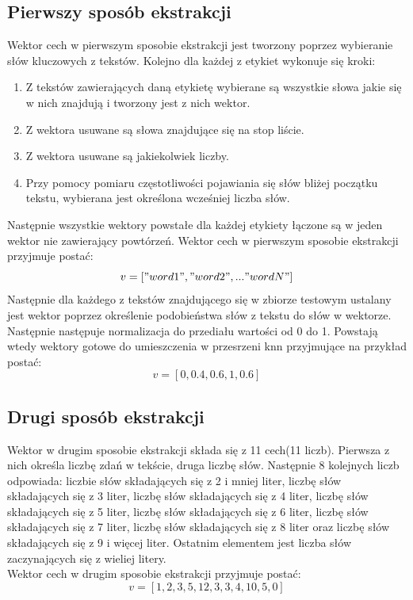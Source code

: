 \documentclass{classrep}
\begin{document}
	\subsection{Pierwszy sposób ekstrakcji}
	Wektor cech w pierwszym sposobie ekstrakcji jest tworzony poprzez wybieranie słów kluczowych z tekstów. Kolejno dla każdej z etykiet wykonuje się kroki:
	\begin{enumerate}
	    \item Z tekstów zawierających daną etykietę wybierane są wszystkie słowa jakie się w nich znajdują i tworzony jest z nich wektor.
	    \item Z wektora usuwane są słowa znajdujące się na stop liście.
	    \item Z wektora usuwane są jakiekolwiek liczby.
	    \item Przy pomocy pomiaru częstotliwości pojawiania się słów bliżej początku tekstu, wybierana jest określona wcześniej liczba słów.
	\end{enumerate}
	Następnie wszystkie wektory powstałe dla każdej etykiety łączone są w jeden wektor nie zawierający powtórzeń.
	Wektor cech w pierwszym sposobie ekstrakcji przyjmuje postać:
	\[ v = ["word1", "word2", ... "wordN"]\]
	Następnie dla każdego z tekstów znajdującego się w zbiorze testowym ustalany jest wektor poprzez określenie podobieństwa słów z tekstu do słów w wektorze. Następnie następuje normalizacja do przediału wartości od 0 do 1. Powstają wtedy wektory gotowe do umieszczenia w przesrzeni knn przyjmujące na przykład postać:
	\[ v=[0, 0.4, 0.6, 1, 0.6]\]
	
\subsection{Drugi sposób ekstrakcji}
	Wektor w drugim sposobie ekstrakcji składa się z 11 cech(11 liczb). Pierwsza z nich określa liczbę zdań w tekście, druga liczbę słów. Następnie 8 kolejnych liczb odpowiada: liczbie słów składających się z 2 i mniej liter, liczbę słów składających się z 3 liter, liczbę słów składających się z 4 liter, liczbę słów składających się z 5 liter, liczbę słów składających się z 6 liter, liczbę słów składających się z 7 liter, liczbę słów składających się z 8 liter oraz  liczbę słów składających się z 9 i więcej liter. Ostatnim elementem jest liczba słów zaczynających się z wieliej litery.\\
	Wektor cech w drugim sposobie ekstrakcji przyjmuje postać:
	\[v=[1, 2, 3, 5, 12, 3, 3, 4, 10, 5, 0] \]
	
\end{document}
